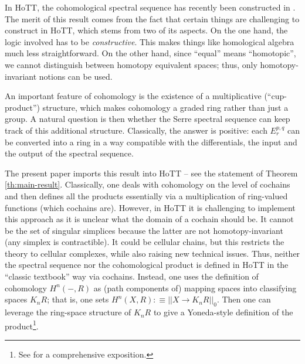 \documentclass{amsart}
\theoremstyle{definition}
\begin{document}
In HoTT, the cohomological spectral sequence has recently been constructed in \cite{Flo}. The merit of this result comes from the fact that certain things are challenging to construct in HoTT, which stems from two of its aspects. On the one hand, the logic involved has to be \textit{constructive}. This makes things like homological algebra much less straightforward. On the other hand, since ``equal'' means ``homotopic'', we cannot distinguish between homotopy equivalent spaces; thus, only homotopy-invariant notions can be used.

An important feature of cohomology is the existence of a multiplicative (``cup-product'') structure, which makes cohomology a graded ring rather than just a group. A natural question is then whether the Serre spectral sequence can keep track of this additional structure. Classically, the answer is positive: each $E^{p,q}_r$ can be converted into a ring in a way compatible with the differentials, the input and the output of the spectral sequence.

The present paper imports this result into HoTT -- see the statement of Theorem \ref{th:main-result}. Classically, one deals with cohomology on the level of cochains and then defines all the products essentially via a multiplication of ring-valued functions (which cochains are). However, in HoTT it is challenging to implement this approach as it is unclear what the domain of a cochain should be. It cannot be the set of singular simplices because the latter are not homotopy-invariant (any simplex is contractible). It could be cellular chains, but this restricts the theory to cellular complexes, while also raising new technical issues.
Thus, neither the spectral sequence nor the cohomological product is defined in HoTT in the ``classic textbook'' way via cochains. Instead, one uses the definition of cohomology $H^n(-,R)$ as (path components of) mapping spaces into classifying spaces $K_n R$; that is, one sets $H^n(X,R) : \equiv ||X \to K_n R||_0$. Then one can leverage the ring-space structure of $K_n R$ to give a Yoneda-style definition of the product\footnote{See \cite{LjuMor} for a comprehensive exposition.}.
\end{document}
